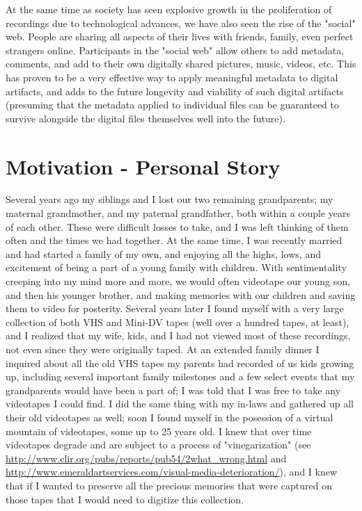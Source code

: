 At the same time as society has seen explosive growth in the proliferation of recordings due to technological advances, we have also seen the rise of the "social" web.  People are sharing all aspects of their lives with friends, family, even perfect strangers online.  Participants in the "social web" allow others to add metadata, comments, and add to their own digitally shared pictures, music, videos, etc.  This has proven to be a very effective way to apply meaningful metadata to digital artifacts, and adds to the future longevity and viability of such digital artifacts (presuming that the metadata applied to individual files can be guaranteed to survive alongside the digital files themselves well into the future).




\section{Motivation - Personal Story}
\label{sec:problem-statement:personal-story}

Several years ago my siblings and I lost our two remaining grandparents; my maternal grandmother, and my paternal grandfather, both within a couple years of each other.  These were difficult losses to take, and I was left thinking of them often and the times we had together.  At the same time, I was recently married and had started a family of my own, and enjoying all the highs, lows, and excitement of being a part of a young family with children.  With sentimentality creeping into my mind more and more, we would often videotape our young son, and then his younger brother, and making memories with our children and saving them to video for posterity.  Several years later I found myself with a very large collection of both VHS and Mini-DV tapes (well over a hundred tapes, at least), and I realized that my wife, kids, and I had not viewed most of these recordings, not even since they were originally taped.  At an extended family dinner I inquired about all the old VHS tapes my parents had recorded of us kids growing up, including several important family milestones and a few select events that my grandparents would have been a part of; I was told that I was free to take any videotapes I could find.  I did the same thing with my in-laws and gathered up all their old videotapes as well; soon I found myself in the posession of a virtual mountain of videotapes, some up to 25 years old.  I knew that over time videotapes degrade and are subject to a process of "vinegarization" (see \url{http://www.clir.org/pubs/reports/pub54/2what_wrong.html} and \url{http://www.emeraldartservices.com/visual-media-deterioration/}), and I knew that if I wanted to preserve all the precious memories that were captured on those tapes that I would need to digitize this collection.


